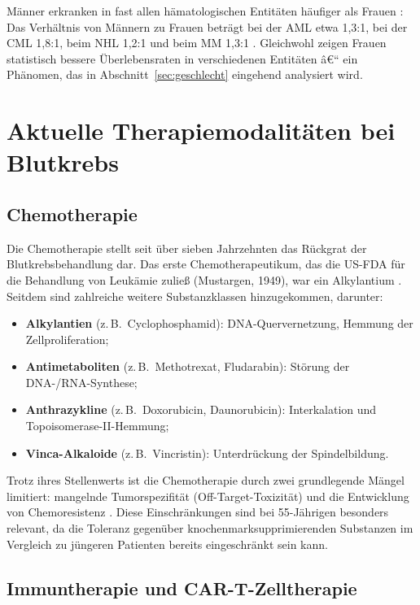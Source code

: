 ﻿\documentclass[12pt,a4paper]{article}
\theoremstyle{definition}
\begin{document}
Männer erkranken in fast allen hämatologischen Entitäten häufiger als Frauen
\cite{cook2009}: Das Verhältnis von Männern zu Frauen beträgt bei der AML etwa 1,3:1,
bei der CML 1,8:1, beim NHL 1,2:1 und beim MM 1,3:1 \cite{siegel2023}. Gleichwohl
zeigen Frauen statistisch bessere Überlebensraten in verschiedenen Entitäten
\cite{micheli2009} â€“ ein Phänomen, das in Abschnitt~\ref{sec:geschlecht} eingehend
analysiert wird.

\section{Aktuelle Therapiemodalitäten bei Blutkrebs}
\label{sec:therapie}

\subsection{Chemotherapie}

Die Chemotherapie stellt seit über sieben Jahrzehnten das Rückgrat der
Blutkrebsbehandlung dar. Das erste Chemotherapeutikum, das die US-FDA für die
Behandlung von Leukämie zuließ (Mustargen, 1949), war ein Alkylantium
\cite{adeyemi2025}. Seitdem sind zahlreiche weitere Substanzklassen hinzugekommen,
darunter:
\begin{itemize}
  \item \textbf{Alkylantien} (z.\,B.\ Cyclophosphamid): DNA-Quervernetzung,
        Hemmung der Zellproliferation;
  \item \textbf{Antimetaboliten} (z.\,B.\ Methotrexat, Fludarabin):
        Störung der DNA-/RNA-Synthese;
  \item \textbf{Anthrazykline} (z.\,B.\ Doxorubicin, Daunorubicin):
        Interkalation und Topoisomerase-II-Hemmung;
  \item \textbf{Vinca-Alkaloide} (z.\,B.\ Vincristin): Unterdrückung
        der Spindelbildung.
\end{itemize}

Trotz ihres Stellenwerts ist die Chemotherapie durch zwei grundlegende Mängel
limitiert: mangelnde Tumorspezifität (Off-Target-Toxizität) und die Entwicklung von
Chemoresistenz \cite{adeyemi2025,mccabe2015}. Diese Einschränkungen sind bei
55-Jährigen besonders relevant, da die Toleranz gegenüber knochenmarksupprimierenden
Substanzen im Vergleich zu jüngeren Patienten bereits eingeschränkt sein kann.

\subsection{Immuntherapie und CAR-T-Zelltherapie}
\end{document}
